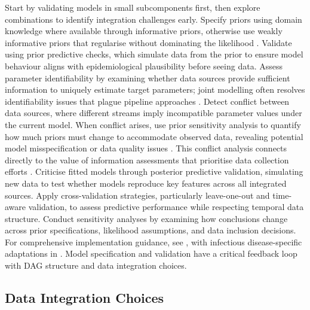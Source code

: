 \documentclass{article}
\begin{document}
Start by validating models in small subcomponents first, then explore combinations to identify integration challenges early.
Specify priors using domain knowledge where available through informative priors, otherwise use weakly informative priors that regularise without dominating the likelihood \citep{gelman2020bayesian}.
Validate using prior predictive checks, which simulate data from the prior to ensure model behaviour aligns with epidemiological plausibility before seeing data.
Assess parameter identifiability by examining whether data sources provide sufficient information to uniquely estimate target parameters; joint modelling often resolves identifiability issues that plague pipeline approaches \citep{@placeholder}.
Detect conflict between data sources, where different streams imply incompatible parameter values under the current model.
When conflict arises, use prior sensitivity analysis to quantify how much priors must change to accommodate observed data, revealing potential model misspecification or data quality issues \citep{roos2015sensitivity,nott2021approximation,kallioinen2021detecting}.
This conflict analysis connects directly to the value of information assessments that prioritise data collection efforts \citep{jackson2019value}.
Criticise fitted models through posterior predictive validation, simulating new data to test whether models reproduce key features across all integrated sources.
Apply cross-validation strategies, particularly leave-one-out and time-aware validation, to assess predictive performance while respecting temporal data structure.
Conduct sensitivity analyses by examining how conclusions change across prior specifications, likelihood assumptions, and data inclusion decisions.
For comprehensive implementation guidance, see \citet{gelman2020bayesian}, with infectious disease-specific adaptations in \citet{bouman2024bayesian}.
Model specification and validation have a critical feedback loop with DAG structure and data integration choices.

\subsection{Data Integration Choices}

\end{document}
